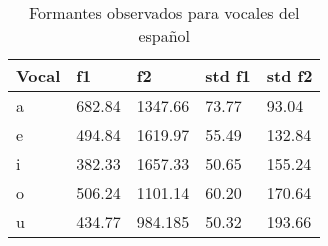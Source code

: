 \begin{table}[H]
\centering
\caption{Formantes observados para vocales del español}
\label{tab:formantes_observador}
\begin{tabular}{|l|l|l|l|l|}
\hline
\textbf{Vocal} & \textbf{f1} & \textbf{f2} & \textbf{std f1} & \textbf{std f2} \\ \hline
a   & 682.84 & 1347.66 & 73.77 & 93.04 \\ \hline
e   & 494.84 & 1619.97 & 55.49 & 132.84\\ \hline
i   & 382.33 & 1657.33 & 50.65 & 155.24 \\ \hline
o   & 506.24 & 1101.14 & 60.20 & 170.64\\ \hline
u   & 434.77 & 984.185 & 50.32 & 193.66\\ \hline

\end{tabular}
\end{table}